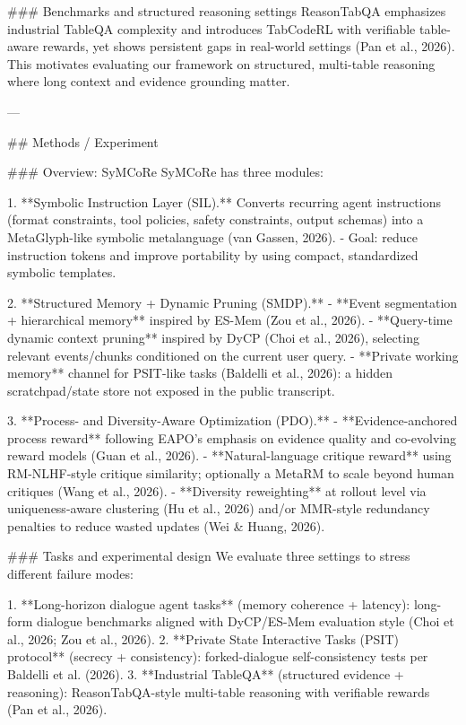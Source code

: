 ### Benchmarks and structured reasoning settings  
ReasonTabQA emphasizes industrial TableQA complexity and introduces TabCodeRL with verifiable table-aware rewards, yet shows persistent gaps in real-world settings (Pan et al., 2026). This motivates evaluating our framework on structured, multi-table reasoning where long context and evidence grounding matter.

---

## Methods / Experiment  

### Overview: SyMCoRe  
SyMCoRe has three modules:

1. **Symbolic Instruction Layer (SIL).** Converts recurring agent instructions (format constraints, tool policies, safety constraints, output schemas) into a MetaGlyph-like symbolic metalanguage (van Gassen, 2026).  
   - Goal: reduce instruction tokens and improve portability by using compact, standardized symbolic templates.

2. **Structured Memory + Dynamic Pruning (SMDP).**  
   - **Event segmentation + hierarchical memory** inspired by ES-Mem (Zou et al., 2026).  
   - **Query-time dynamic context pruning** inspired by DyCP (Choi et al., 2026), selecting relevant events/chunks conditioned on the current user query.  
   - **Private working memory** channel for PSIT-like tasks (Baldelli et al., 2026): a hidden scratchpad/state store not exposed in the public transcript.

3. **Process- and Diversity-Aware Optimization (PDO).**  
   - **Evidence-anchored process reward** following EAPO’s emphasis on evidence quality and co-evolving reward models (Guan et al., 2026).  
   - **Natural-language critique reward** using RM-NLHF-style critique similarity; optionally a MetaRM to scale beyond human critiques (Wang et al., 2026).  
   - **Diversity reweighting** at rollout level via uniqueness-aware clustering (Hu et al., 2026) and/or MMR-style redundancy penalties to reduce wasted updates (Wei & Huang, 2026).

### Tasks and experimental design  
We evaluate three settings to stress different failure modes:

1. **Long-horizon dialogue agent tasks** (memory coherence + latency): long-form dialogue benchmarks aligned with DyCP/ES-Mem evaluation style (Choi et al., 2026; Zou et al., 2026).  
2. **Private State Interactive Tasks (PSIT) protocol** (secrecy + consistency): forked-dialogue self-consistency tests per Baldelli et al. (2026).  
3. **Industrial TableQA** (structured evidence + reasoning): ReasonTabQA-style multi-table reasoning with verifiable rewards (Pan et al., 2026).

